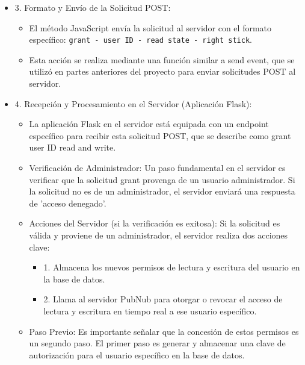 \documentclass{report}
\begin{document}
\begin{itemize}
\begin{itemize}
        \end{itemize}
    \item 3. Formato y Envío de la Solicitud POST:
        \begin{itemize}
            \item El método JavaScript envía la solicitud al servidor con el formato específico: \verb|grant - user ID - read state - right stick|.
            \item Esta acción se realiza mediante una función similar a send event, que se utilizó en partes anteriores del proyecto 
            para enviar solicitudes POST al servidor.
        \end{itemize}
    \item 4. Recepción y Procesamiento en el Servidor (Aplicación Flask):
        \begin{itemize}
            \item La aplicación Flask en el servidor está equipada con un endpoint específico para recibir esta solicitud POST, que se 
            describe como grant user ID read and write.
            \item Verificación de Administrador: Un paso fundamental en el servidor es verificar que la solicitud grant provenga de un 
            usuario administrador. Si la solicitud no es de un administrador, el servidor enviará una respuesta de 'acceso denegado'.
            \item Acciones del Servidor (si la verificación es exitosa): Si la solicitud es válida y proviene de un administrador, el 
            servidor realiza dos acciones clave:
                \begin{itemize}
                    \item 1. Almacena los nuevos permisos de lectura y escritura del usuario en la base de datos.
                    \item 2. Llama al servidor PubNub para otorgar o revocar el acceso de lectura y escritura en tiempo real a ese usuario específico.
                \end{itemize}
            \item Paso Previo: Es importante señalar que la concesión de estos permisos es un segundo paso. El primer paso es generar y 
            almacenar una clave de autorización para el usuario específico en la base de datos.
        \end{itemize}
\end{itemize}
\end{document}
